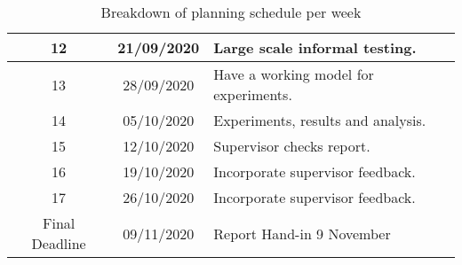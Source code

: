 \begin{table}[H]
\begin{center}
\begin{tabular}{|c|c|p{8cm}|}
      12 & 21/09/2020 & Large scale informal testing.\\ \hline
      
      13 & 28/09/2020 & Have a working model for experiments.\\ \hline
      
      14 & 05/10/2020 & Experiments, results and analysis.\\ \hline
      
      
      15 & 12/10/2020 & Supervisor checks report.\\ \hline
      
      16 & 19/10/2020 & Incorporate supervisor feedback.\\ \hline
      
      17 & 26/10/2020 & Incorporate supervisor feedback.\\ \hline
      
      Final Deadline & 09/11/2020 &  Report Hand-in 9 November\\ 
      
      \hline
    \end{tabular}
  \end{center}
  \caption{Breakdown of planning schedule per week}
    \label{tab:tablea1}
\end{table}